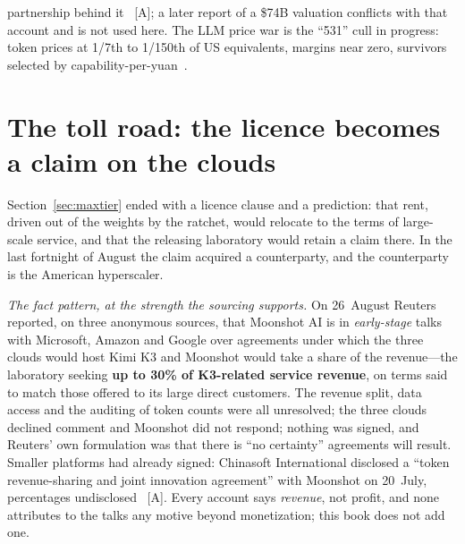 partnership behind it~\cite{deepseek-round} [A]; a later report of a \$74B valuation conflicts with that account and is not used here. The LLM price war is the ``531'' cull in progress: token prices at 1/7th to 1/150th of US equivalents, margins near zero, survivors selected by capability-per-yuan~\cite{token-econ}.

\section{The toll road: the licence becomes a claim on the clouds}
\label{sec:toll-road}

Section~\ref{sec:maxtier} ended with a licence clause and a prediction: that rent, driven out of the weights by the ratchet, would relocate to the terms of large-scale service, and that the releasing laboratory would retain a claim there. In the last fortnight of August the claim acquired a counterparty, and the counterparty is the American hyperscaler.

\emph{The fact pattern, at the strength the sourcing supports.} On 26~August Reuters reported, on three anonymous sources, that Moonshot AI is in \emph{early-stage} talks with Microsoft, Amazon and Google over agreements under which the three clouds would host Kimi K3 and Moonshot would take a share of the revenue---the laboratory seeking \textbf{up to 30\% of K3-related service revenue}, on terms said to match those offered to its large direct customers. The revenue split, data access and the auditing of token counts were all unresolved; the three clouds declined comment and Moonshot did not respond; nothing was signed, and Reuters' own formulation was that there is ``no certainty'' agreements will result. Smaller platforms had already signed: Chinasoft International disclosed a ``token revenue-sharing and joint innovation agreement'' with Moonshot on 20~July, percentages undisclosed~\cite{moonshot-cloud-talks,kimi-k3-license-maas} [A]. Every account says \emph{revenue}, not profit, and none attributes to the talks any motive beyond monetization; this book does not add one.

